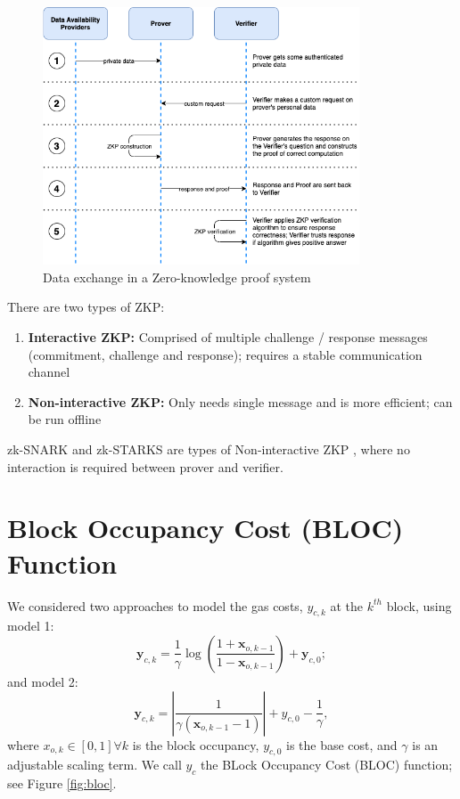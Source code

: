 \documentclass[peerreview]{ieeesyscoin}
\begin{document}
\begin{figure}[h!]
\includegraphics[width=3.7in]{img/zkp.png}
\caption{Data exchange in a Zero-knowledge proof system} 
\label{fig:zkp}
\end{figure} 

There are two types of ZKP:

\begin{enumerate}
\item \textbf{Interactive ZKP:} Comprised of multiple challenge / response messages (commitment, challenge and response); requires a stable communication channel
\item \textbf{Non-interactive ZKP:} Only needs single message and is more efficient; can be run offline
\end{enumerate}
zk-SNARK and zk-STARKS are types of Non-interactive ZKP , where no interaction is required between prover and verifier.

\section{Block Occupancy Cost (BLOC) Function}

We considered two approaches to model the gas costs, $y_{c,k}$ at the $k^{th}$ block, using model 1:
\begin{equation}
\mathbf{y}_{c,k} = \dfrac{1}{\gamma}\log\left(\dfrac{1+\mathbf{x}_{o,k-1}}{1-\mathbf{x}_{o,k-1}}\right) + \mathbf{y}_{c,0};
\end{equation}
and model 2:
\begin{equation}
\mathbf{y}_{c,k} = \left| \dfrac{1}{\gamma(\mathbf{x}_{o,k-1}-1)} \right| + y_{c,0} - \dfrac{1}{\gamma},
\end{equation}
where $x_{o,k} \in [0,1] \forall k$ is the block occupancy, $y_{c,0}$ is the base cost, and $\gamma$ is an adjustable scaling term. We call $y_{c}$ the BLock Occupancy Cost (BLOC) function; see Figure \ref{fig:bloc}.
\end{document}

